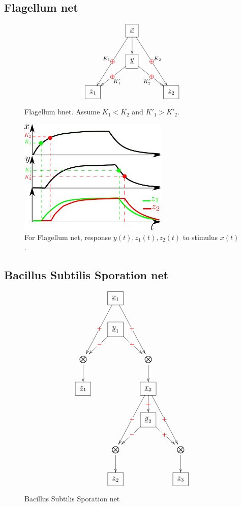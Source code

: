 \newpage
\subsection{Flagellum net}

\begin{figure}[h!]
$$
\xymatrix@C=3pc{
&\Rect{\rvx}\ar[d]
\ar[ddl]|\redoplus_{K_1}
\ar[ddr]|\redoplus^{K_2}
\\
&\Rect{\rvy}\ar[dl]|\redoplus^{K'_1}
\ar[dr]|\redoplus_{K'_2}
\\
\Rect{\rvz_1}&
&\Rect{\rvz_2}
}
$$
\caption{Flagellum bnet. Assume $K_1<K_2$ and $K'_1 > K'_2$.}
\label{fig-flagellum}
\end{figure}

\begin{figure}[h!]
\centering
\includegraphics[width=2.8in]
{autoregulons/flagellum.png}
\caption{For Flagellum net, response  $y(t), z_1(t), z_2(t)$ to stimulus $x(t)$.}
\label{fig-flagellum-net}
\end{figure}


\subsection{Bacillus Subtilis Sporation net}

\begin{figure}[h!]
$$
\xymatrix{
&\Rect{\rvx_1}\ar[ddl]|\redplus
\ar[ddr]|\redplus
\\
&\Rect{\rvy_1}
\ar[dl]|\redminus
\ar[dr]|\redplus
\\
\bigotimes\ar[d]
&&\bigotimes\ar[d]
\\
\Rect{\rvz_1}
&&\Rect{\rvx_2}
\ar[d]|\redplus
\ar[ddl]|\redplus
\ar[ddr]|\redplus
\\
&&\Rect{\rvy_2}\ar[dl]|\redminus
\ar[dr]|\redplus
\\
&\bigotimes\ar[d]
&&\bigotimes\ar[d]
\\
&\Rect{\rvz_2}
&&\Rect{\rvz_3}
}$$
\caption{Bacillus Subtilis  Sporation net}
\label{fig-bac-sub}
\end{figure}


